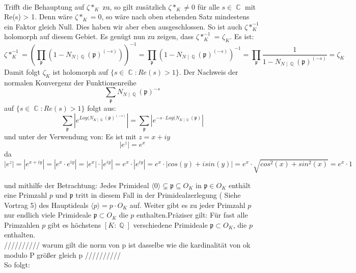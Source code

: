 \documentclass[10pt,a4paper]{article}
\DeclareMathOperator{\C}{\mathbb{C}}
\DeclareMathOperator{\Q}{\mathbb{Q}}
\begin{document}
\\
Trifft die Behauptung auf $\zeta*_{K}$ zu, so gilt zusätzlich $\zeta*_{K} \neq 0$ für alle  $s \in \C$ mit Re(s) > 1. Denn wäre  $\zeta*_{K} = 0$, so wäre nach oben stehenden Satz mindestens ein Faktor gleich Null. Dies haben wir aber eben ausgeschlossen. So ist auch  $\zeta*_{K}^{-1}$ holomorph auf diesem Gebiet. Es genügt nun zu zeigen, dass 
$\zeta*_{K}^{-1}$ = $\zeta_{K}$. Es ist: $$\zeta*_{K}^{-1}=(\prod_{\mathfrak{p}}(1 - N_{N\mid\Q}(\mathfrak{p})^{(-s)}))^{-1} =\prod_{\mathfrak{p}}(1 - N_{N\mid\Q}(\mathfrak{p})^{(-s)})^{-1} = \prod_{\mathfrak{p}}\frac{1}{1 - N_{N\mid\Q}(\mathfrak{p})^{(-s)}}=\zeta_{K}$$
Damit folgt $\zeta_{K}$ ist holomorph auf $\{ s \in \C \colon Re(s) > 1\}$. Der Nachweis der normalen Konvergenz der Funktionenreihe $$\sum_{\mathfrak{p}}N_{N\mid\Q}(\mathfrak{p})^{-s}$$ auf $\{ s \in \C \colon Re(s) > 1\}$ folgt aus:$$\sum_{\mathfrak{p}}|e^{Log(N_{K\mid \Q}(\mathfrak{p})^{(-s)}}| = \sum_{\mathfrak{p}}|e^{-s\cdot Log(N_{K\mid \Q}(\mathfrak{p})}|$$
 und unter der Verwendung von: 
 Es ist mit $z = x + iy$ $$|e^z| = e^x $$ da $$|e^z|=|e^{x+iy}|=|e^{x}\cdot e^{iy}|= |e^{x}|\cdot |e^{iy}| = e^{x}\cdot |e^{iy}| = e^x \cdot |cos(y)+isin(y)| = e^x\cdot\sqrt{cos^2(x)+sin^2(x)}  =e^x\cdot 1$$
 
und mithilfe der Betrachtung: Jedes Primideal $\langle0\rangle\subsetneq \mathfrak{p} \subseteq O_{\textit{K}}$ in $\mathfrak{p} \in O_K$ enthält eine Primzahl $p$ und $\mathfrak{p}$ tritt in diesem Fall in der Primidealzerlegung ( Siehe Vortrag 5) des Hauptideals $\langle p \rangle=p\cdot O_K$ auf. Weiter gibt es zu jeder Primzahl $p$ nur endlich viele Primideale $\mathfrak{p}\subset O_K$ die $p$ enthalten.Präziser gilt: Für fast alle Primzahlen $p$ gibt es höchstens $[K\colon \Q]$ verschiedene Primideale $\mathfrak{p}\subset O_K$, die $p$ enthalten. 
\\
////////// warum gilt die norm von p ist dasselbe wie die kardinalität von ok modulo P größer gleich p
//////////
\\
So folgt:
\end{document}
